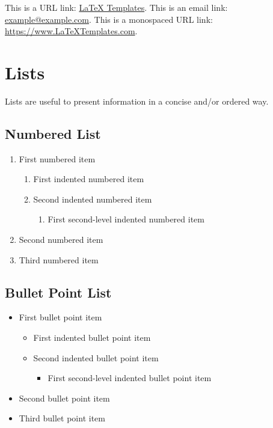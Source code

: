 \documentclass[
	11pt,
	fleqn,
	a4paper,
]{LegrandOrangeBook}
\begin{document}
This is a URL link: \href{https://www.latextemplates.com}{LaTeX Templates}. This is an email link: \href{mailto:example@example.com}{example@example.com}. This is a monospaced URL link: \url{https://www.LaTeXTemplates.com}.


\section{Lists}

Lists are useful to present information in a concise and/or ordered way.

\subsection{Numbered List}

\begin{enumerate}
    \item First numbered item
          \begin{enumerate}
              \item First indented numbered item
              \item Second indented numbered item
                    \begin{enumerate}
                        \item First second-level indented numbered item
                    \end{enumerate}
          \end{enumerate}
    \item Second numbered item
    \item Third numbered item
\end{enumerate}

\subsection{Bullet Point List}

\begin{itemize}
    \item First bullet point item
          \begin{itemize}
              \item First indented bullet point item
              \item Second indented bullet point item
                    \begin{itemize}
                        \item First second-level indented bullet point item
                    \end{itemize}
          \end{itemize}
    \item Second bullet point item
    \item Third bullet point item
\end{itemize}
\end{document}
